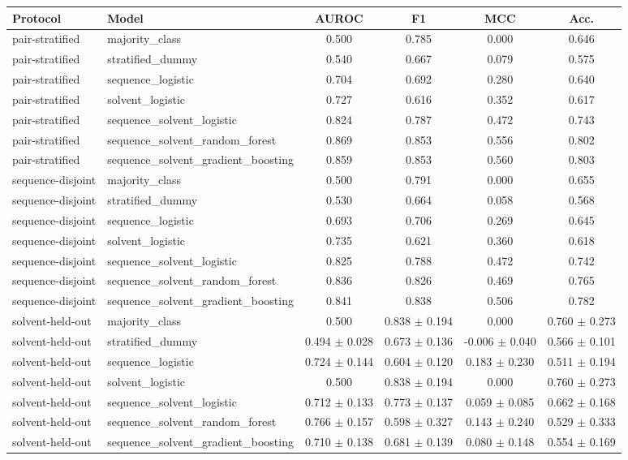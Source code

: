 \begin{tabular}{llcccc}
\toprule
\textbf{Protocol} & \textbf{Model} & \textbf{AUROC} & \textbf{F1} & \textbf{MCC} & \textbf{Acc.} \\
\midrule
pair-stratified & majority\_class & 0.500 & 0.785 & 0.000 & 0.646 \\
pair-stratified & stratified\_dummy & 0.540 & 0.667 & 0.079 & 0.575 \\
pair-stratified & sequence\_logistic & 0.704 & 0.692 & 0.280 & 0.640 \\
pair-stratified & solvent\_logistic & 0.727 & 0.616 & 0.352 & 0.617 \\
pair-stratified & sequence\_solvent\_logistic & 0.824 & 0.787 & 0.472 & 0.743 \\
pair-stratified & sequence\_solvent\_random\_forest & 0.869 & 0.853 & 0.556 & 0.802 \\
pair-stratified & sequence\_solvent\_gradient\_boosting & 0.859 & 0.853 & 0.560 & 0.803 \\
\midrule
sequence-disjoint & majority\_class & 0.500 & 0.791 & 0.000 & 0.655 \\
sequence-disjoint & stratified\_dummy & 0.530 & 0.664 & 0.058 & 0.568 \\
sequence-disjoint & sequence\_logistic & 0.693 & 0.706 & 0.269 & 0.645 \\
sequence-disjoint & solvent\_logistic & 0.735 & 0.621 & 0.360 & 0.618 \\
sequence-disjoint & sequence\_solvent\_logistic & 0.825 & 0.788 & 0.472 & 0.742 \\
sequence-disjoint & sequence\_solvent\_random\_forest & 0.836 & 0.826 & 0.469 & 0.765 \\
sequence-disjoint & sequence\_solvent\_gradient\_boosting & 0.841 & 0.838 & 0.506 & 0.782 \\
\midrule
solvent-held-out & majority\_class & 0.500 & 0.838 $\pm$ 0.194 & 0.000 & 0.760 $\pm$ 0.273 \\
solvent-held-out & stratified\_dummy & 0.494 $\pm$ 0.028 & 0.673 $\pm$ 0.136 & -0.006 $\pm$ 0.040 & 0.566 $\pm$ 0.101 \\
solvent-held-out & sequence\_logistic & 0.724 $\pm$ 0.144 & 0.604 $\pm$ 0.120 & 0.183 $\pm$ 0.230 & 0.511 $\pm$ 0.194 \\
solvent-held-out & solvent\_logistic & 0.500 & 0.838 $\pm$ 0.194 & 0.000 & 0.760 $\pm$ 0.273 \\
solvent-held-out & sequence\_solvent\_logistic & 0.712 $\pm$ 0.133 & 0.773 $\pm$ 0.137 & 0.059 $\pm$ 0.085 & 0.662 $\pm$ 0.168 \\
solvent-held-out & sequence\_solvent\_random\_forest & 0.766 $\pm$ 0.157 & 0.598 $\pm$ 0.327 & 0.143 $\pm$ 0.240 & 0.529 $\pm$ 0.333 \\
solvent-held-out & sequence\_solvent\_gradient\_boosting & 0.710 $\pm$ 0.138 & 0.681 $\pm$ 0.139 & 0.080 $\pm$ 0.148 & 0.554 $\pm$ 0.169 \\
\bottomrule
\end{tabular}
